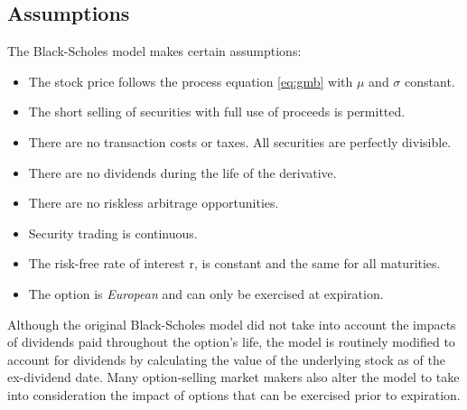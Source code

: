 \subsection{ Assumptions}
\noindent The Black-Scholes model makes certain assumptions:\\
\begin{itemize}
	\item The stock price follows the process equation \ref{eq:gmb} with $\mu$ and $\sigma$ constant.
	\item The short selling of securities with full use of proceeds is permitted.
	\item There are no transaction costs or taxes. All securities are perfectly divisible.
	\item There are no dividends during the life of the derivative.
	\item There are no riskless arbitrage opportunities.
	\item Security trading is continuous.
	\item The risk-free rate of interest r, is constant and the same for all maturities.
	\item The option is \emph{European} and can only be exercised at expiration.
\end{itemize}
Although the original Black-Scholes model did not take into account the impacts of dividends paid throughout the option's life, the model is routinely modified to account for dividends by calculating the value of the underlying stock as of the ex-dividend date. Many option-selling market makers also alter the model to take into consideration the impact of options that can be exercised prior to expiration.

